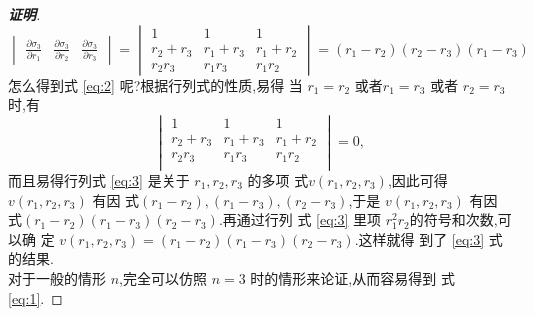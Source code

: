 \documentclass[a4paper]{article}
\newcommand{\pa}{\partial} \newcommand{\Om}{\Omega}
\begin{document}
\begin{proof}[\bf{证明}]
\begin{equation}
\begin{vmatrix}
    \frac{\pa \sigma_3}{\pa r_1}&\frac{\pa\sigma_3}{\pa r_2}&\frac{\pa
      \sigma_3}{\pa r_3}
  \end{vmatrix}=
  \begin{vmatrix}
    1&1&1\\
    r_2+r_3&r_1+r_3&r_1+r_2\\
    r_2r_3&r_1r_3&r_1r_2
  \end{vmatrix}=(r_1-r_2)(r_2-r_3)(r_1-r_3)
\end{equation}\label{eq:3}
怎么得到式 \eqref{eq:2} 呢?根据行列式的性质,易得
当 $r_1=r_2$ 或者$r_1=r_3$ 或者 $r_2=r_3$ 时,有
\begin{equation}
  \begin{vmatrix}
    1&1&1\\
    r_2+r_3&r_1+r_3&r_1+r_2\\
    r_2r_3&r_1r_3&r_1r_2\\
  \end{vmatrix}=0,
\end{equation}
而且易得行列式 \eqref{eq:3} 是关于 $r_1,r_2,r_3$ 的多项
式$v(r_1,r_2,r_3)$,因此可得 $v(r_1,r_2,r_3)$ 有因
式$(r_1-r_2),(r_1-r_3),(r_2-r_3)$,于是 $v(r_1,r_2,r_3)$ 有因
式$(r_1-r_2)(r_1-r_3)(r_2-r_3)$.再通过行列
式 \eqref{eq:3} 里项 $r_1^2r_2$的符号和次数,可以确
定 $v(r_1,r_2,r_3)=(r_1-r_2)(r_1-r_3)(r_2-r_3)$.这样就得
到了 \eqref{eq:3} 式的结果.\\

对于一般的情形 $n$,完全可以仿照 $n=3$ 时的情形来论证,从而容易得到
式 \eqref{eq:1}.
\end{proof}
\end{document}
